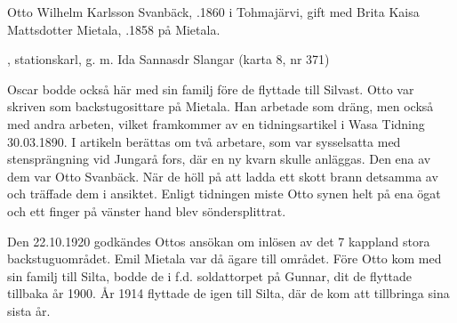 
%
Otto Wilhelm Karlsson Svanbäck, .1860 i Tohmajärvi, gift med Brita Kaisa Mattsdotter Mietala, .1858 på Mietala.
\begin{jhchildren}
  \item {}
  \item {}
  \item {}
  \item {}
  \item {}, stationskarl, g. m. Ida Sannasdr Slangar (karta 8, nr 371)
  \item {}
  \item {}
  \item {}
  \item {}
\end{jhchildren}

Oscar bodde också här med sin familj före de flyttade till Silvast. Otto var skriven som backstugosittare på Mietala. Han arbetade som dräng, men också med andra arbeten, vilket framkommer av en tidningsartikel i Wasa Tidning 30.03.1890. I artikeln berättas om två arbetare, som var sysselsatta med stensprängning vid Jungarå fors, där en ny kvarn skulle anläggas. Den ena av dem var Otto Svanbäck. När de höll på att ladda ett skott brann detsamma av och träffade dem i ansiktet. Enligt tidningen miste Otto synen helt på ena ögat och ett finger på vänster hand blev söndersplittrat.

Den 22.10.1920 godkändes Ottos ansökan om inlösen av det 7 kappland stora backstuguområdet. Emil Mietala var då ägare till området. Före Otto kom med sin familj till Silta, bodde de i f.d. soldattorpet på Gunnar, dit de flyttade tillbaka år 1900. År 1914 flyttade de igen till Silta, där de kom att tillbringa sina sista år.

